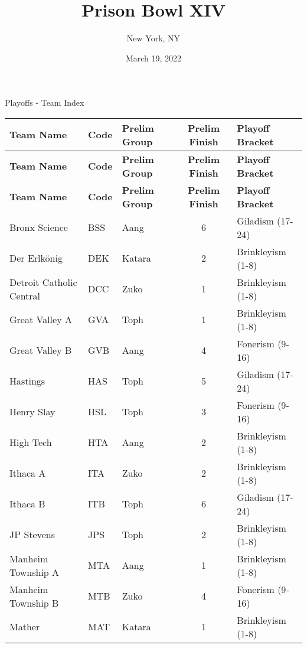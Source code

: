 \documentclass{article}%
\title{Prison Bowl XIV}%
\author{New York, NY}%
\date{March 19, 2022}%
\begin{document}
%
\normalsize%
%
\maketitle%
\vspace*{48pt}%
\begin{center}%
\begin{Huge}%
Playoffs {-} Team Index%
\end{Huge}%
\end{center}%
\newpage%
\pagestyle{fancy}%
\fancyhf{}%
%
%
%
%
%
\begin{longtable}{|ll|lc|l|}%
\rowcolor{gray!30}%
\hline%
\textbf{Team Name} & \textbf{Code}&\textbf{Prelim Group}&\textbf{Prelim Finish}&\textbf{Playoff Bracket}\\%
\hline%
\endhead%
\hline%
\rowcolor{gray!25}%
\textbf{Team Name} & \textbf{Code}&\textbf{Prelim Group}&\textbf{Prelim Finish}&\textbf{Playoff Bracket}\\%
\hline%
\endfoot%
\hline%
\hline\rowcolor{gray!25}%
\textbf{Team Name} & \textbf{Code}&\textbf{Prelim Group}&\textbf{Prelim Finish}&\textbf{Playoff Bracket}\\%
\hline%
\endlastfoot%
\hline%
Bronx Science&BSS&Aang&6&Giladism (17{-}24)\\%
Der Erlkönig&DEK&Katara&2&Brinkleyism (1{-}8)\\%
Detroit Catholic Central&DCC&Zuko&1&Brinkleyism (1{-}8)\\%
Great Valley A&GVA&Toph&1&Brinkleyism (1{-}8)\\%
Great Valley B&GVB&Aang&4&Fonerism (9{-}16)\\%
Hastings&HAS&Toph&5&Giladism (17{-}24)\\%
Henry Slay&HSL&Toph&3&Fonerism (9{-}16)\\%
High Tech&HTA&Aang&2&Brinkleyism (1{-}8)\\%
Ithaca A&ITA&Zuko&2&Brinkleyism (1{-}8)\\%
Ithaca B&ITB&Toph&6&Giladism (17{-}24)\\%
JP Stevens&JPS&Toph&2&Brinkleyism (1{-}8)\\%
Manheim Township A&MTA&Aang&1&Brinkleyism (1{-}8)\\%
Manheim Township B&MTB&Zuko&4&Fonerism (9{-}16)\\%
Mather&MAT&Katara&1&Brinkleyism (1{-}8)\\%

\end{longtable}
\end{document}
